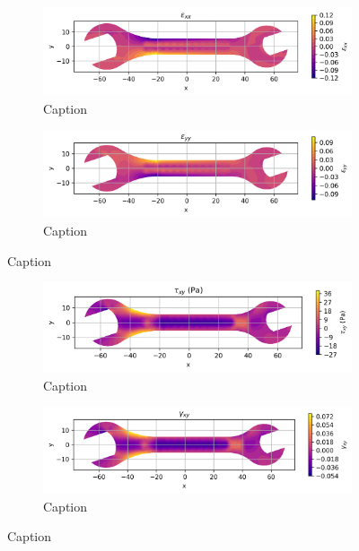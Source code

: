\documentclass{article}  %
\begin{document}
\begin{figure}[H]
  \centering
  \begin{subfigure}[t]{0.49\textwidth}
    \centering
    \includegraphics[width=\textwidth]{GRAFICOS/Case b - epsilon_xx.png}
    \caption{Caption}
    \label{fig:deformada_reacciones}
  \end{subfigure}
  \hfill
  \begin{subfigure}[t]{0.49\textwidth}
    \centering
    \includegraphics[width=\textwidth]{GRAFICOS/Case b - epsilon_yy.png}
    \caption{Caption}
    \label{fig:von_mises}
  \end{subfigure}
  \caption{Caption}
  \label{fig:analisis_estructural}
\end{figure}


\begin{figure}[H]
  \centering
  \begin{subfigure}[t]{0.49\textwidth}
    \centering
    \includegraphics[width=\textwidth]{GRAFICOS/Case b - tau_xy.png}
    \caption{Caption}
    \label{fig:deformada_reacciones}
  \end{subfigure}
  \hfill
  \begin{subfigure}[t]{0.49\textwidth}
    \centering
    \includegraphics[width=\textwidth]{GRAFICOS/Case b - gamma_xy.png}
    \caption{Caption}
    \label{fig:von_mises}
  \end{subfigure}
  \caption{Caption}
  \label{fig:analisis_estructural}
\end{figure}
\end{document}
